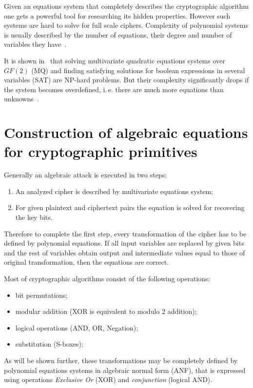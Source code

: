 Given an equations system that completely describes the cryptographic algorithm
one gets a powerful tool for researching its hidden properties. However such
systems are hard to solve for full scale ciphers. Complexity of polynomial
systems is usually described by the number of equations, their degree and number
of variables they have~\cite{bard2009algebraic}. 

It is shown in~\cite{Courtois:MQ-NPhard} that solving multivariate quadratic
equations systems over $GF(2)$ (MQ) and finding satisfying solutions for boolean
expressions in several variables (SAT) are NP-hard problems. But their
complexity significantly drops if the system becomes overdefined, i.\,e. there
are much more equations than unknowns~\cite{DBLP:conf/asiacrypt/CourtoisP02}.


\section{Construction of algebraic equations for cryptographic primitives}
\label{sec:equations}

Generally an algebraic attack is executed in two steps:
\begin{enumerate}
    \item An analyzed cipher is described by multivariate equations system;
    \item For given plaintext and ciphertext pairs the equation is solved for
        recovering the key bits.
\end{enumerate}
Therefore to complete the first step, every transformation of the cipher has to
be defined by polynomial equations. If all input variables are replaced by given
bits and the rest of variables obtain output and intermediate values equal to
those of original transformation, then the equations are correct.

Most of cryptographic algorithms consist of the following operations:
\begin{itemize}
    \item bit permutations;
    \item modular addition (XOR is equivalent to modulo 2 addition);
    \item logical operations (AND, OR, Negation);
    \item substitution (S-boxes);
\end{itemize}

As will be shown further, these transformations may be completely defined by
polynomial equations systems in algebraic normal form (ANF), that is expressed
using operations \textit{Exclusive Or} (XOR) and \textit{conjunction} (logical
AND).


